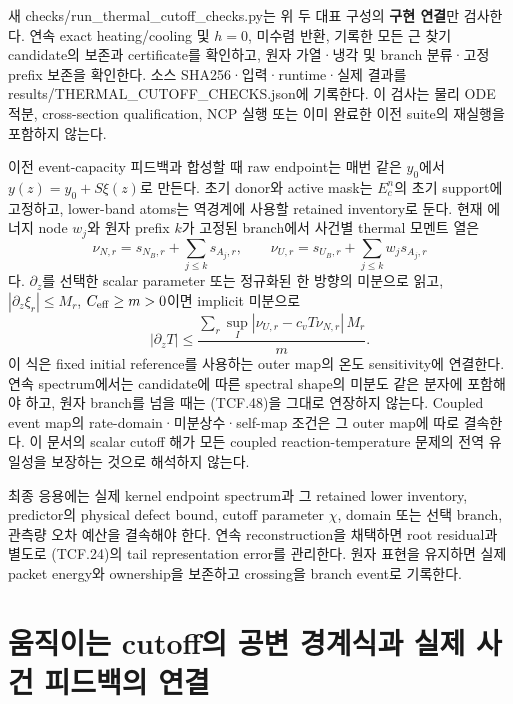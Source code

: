 새 checks/run\_thermal\_cutoff\_checks.py는 위 두 대표 구성의 \textbf{구현 연결}만 검사한다. 연속 exact heating/cooling 및 \(h=0\), 미수렴 반환, 기록한 모든 근 찾기 candidate의 보존과 certificate를 확인하고, 원자 가열·냉각 및 branch 분류·고정 prefix 보존을 확인한다. 소스 SHA256·입력·runtime·실제 결과를 results/THERMAL\_CUTOFF\_CHECKS.json에 기록한다. 이 검사는 물리 ODE 적분, cross-section qualification, NCP 실행 또는 이미 완료한 이전 suite의 재실행을 포함하지 않는다.

이전 event-capacity 피드백과 합성할 때 raw endpoint는 매번 같은 \(y_0\)에서 \(y(z)=y_0+S\xi(z)\)로 만든다. 초기 donor와 active mask는 \(E_c^n\)의 초기 support에 고정하고, lower-band atoms는 역경계에 사용할 retained inventory로 둔다. 현재 에너지 node \(w_j\)와 원자 prefix \(k\)가 고정된 branch에서 사건별 thermal 모멘트 열은 \[
\nu_{N,r}=s_{N_B,r}+\sum_{j\le k}s_{A_j,r},\qquad
\nu_{U,r}=s_{U_B,r}+\sum_{j\le k}w_js_{A_j,r}
\tag{TCF.47}
\] 다. \(\partial_z\)를 선택한 scalar parameter 또는 정규화된 한 방향의 미분으로 읽고, \(|\partial_z\xi_r|\le M_r\), \(C_{\rm eff}\ge m>0\)이면 implicit 미분으로 \[
|\partial_zT|\le
\frac{\sum_r\sup_I|\nu_{U,r}-c_vT\nu_{N,r}|\,M_r}{m}.
\tag{TCF.48}
\] 이 식은 fixed initial reference를 사용하는 outer map의 온도 sensitivity에 연결한다. 연속 spectrum에서는 candidate에 따른 spectral shape의 미분도 같은 분자에 포함해야 하고, 원자 branch를 넘을 때는 (TCF.48)을 그대로 연장하지 않는다. Coupled event map의 rate-domain·미분상수·self-map 조건은 그 outer map에 따로 결속한다. 이 문서의 scalar cutoff 해가 모든 coupled reaction-temperature 문제의 전역 유일성을 보장하는 것으로 해석하지 않는다.

최종 응용에는 실제 kernel endpoint spectrum과 그 retained lower inventory, predictor의 physical defect bound, cutoff parameter \(\chi\), domain 또는 선택 branch, 관측량 오차 예산을 결속해야 한다. 연속 reconstruction을 채택하면 root residual과 별도로 (TCF.24)의 tail representation error를 관리한다. 원자 표현을 유지하면 실제 packet energy와 ownership을 보존하고 crossing을 branch event로 기록한다.

\hypertarget{uxc6c0uxc9c1uxc774uxb294-cutoffuxc758-uxacf5uxbcc0-uxacbduxacc4uxc2dduxacfc-uxc2e4uxc81c-uxc0acuxac74-uxd53cuxb4dcuxbc31uxc758-uxc5f0uxacb0}{%
\section{움직이는 cutoff의 공변 경계식과 실제 사건 피드백의 연결}\label{uxc6c0uxc9c1uxc774uxb294-cutoffuxc758-uxacf5uxbcc0-uxacbduxacc4uxc2dduxacfc-uxc2e4uxc81c-uxc0acuxac74-uxd53cuxb4dcuxbc31uxc758-uxc5f0uxacb0}}

